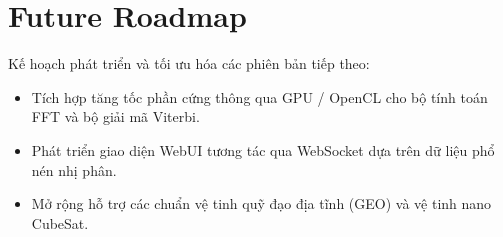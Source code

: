 \documentclass[11pt,a4paper]{article}
\begin{document}
\section{Future Roadmap}
Kế hoạch phát triển và tối ưu hóa các phiên bản tiếp theo:
\begin{itemize}
    \item Tích hợp tăng tốc phần cứng thông qua GPU / OpenCL cho bộ tính toán FFT và bộ giải mã Viterbi.
    \item Phát triển giao diện WebUI tương tác qua WebSocket dựa trên dữ liệu phổ nén nhị phân.
    \item Mở rộng hỗ trợ các chuẩn vệ tinh quỹ đạo địa tĩnh (GEO) và vệ tinh nano CubeSat.
\end{itemize}
\end{document}
